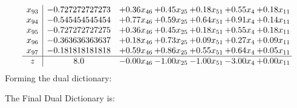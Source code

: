 \documentclass[8pt]{article}
\begin{document}
\[\begin{array}{c| c c@{\hskip 2pt} c@{\hskip 2pt} c@{\hskip 2pt} c@{\hskip 2pt} c@{\hskip 2pt} }
 x_{93}   &  -0.727272727273 & +  0.36 x_{46} & +  0.45 x_{25} & +  0.18 x_{51} & +  0.55 x_{4} & +  0.18 x_{11}\\
 x_{94}   &  -0.545454545454 & +  0.77 x_{46} & +  0.59 x_{25} & +  0.64 x_{51} & +  0.91 x_{4} & +  0.14 x_{11}\\
 x_{95}   &  -0.727272727275 & +  0.36 x_{46} & +  0.45 x_{25} & +  0.18 x_{51} & +  0.55 x_{4} & +  0.18 x_{11}\\
 x_{96}   &  -0.363636363637 & +  0.18 x_{46} & +  0.73 x_{25} & +  0.09 x_{51} & +  0.27 x_{4} & +  0.09 x_{11}\\
 x_{97}   &  -0.181818181818 & +  0.59 x_{46} & +  0.86 x_{25} & +  0.55 x_{51} & +  0.64 x_{4} & +  0.05 x_{11}\\
\hline
z    &  8.0 & -0.00 x_{46} & -1.00 x_{25} & -1.00 x_{51} & -3.00 x_{4} & +  0.00 x_{11}\\
\end{array}\]
Forming the dual dictionary:

The Final Dual Dictionary is: 
\end{document}
